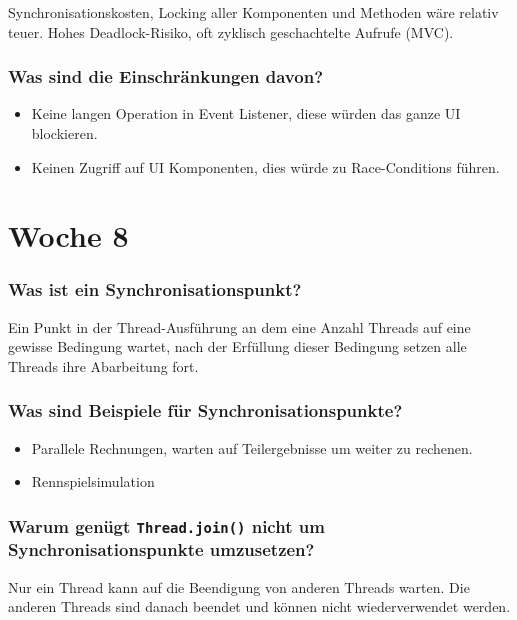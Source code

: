 \documentclass[10pt,a4paper]{scrartcl}
\begin{document}
Synchronisationskosten, Locking aller Komponenten und Methoden wäre relativ teuer.
Hohes Deadlock-Risiko, oft zyklisch geschachtelte Aufrufe (MVC).
   
\subsubsection{Was sind die Einschränkungen davon?}

\begin{itemize}
	\item Keine langen Operation in Event Listener, diese würden das ganze UI blockieren.
	\item Keinen Zugriff auf UI Komponenten, dies würde zu Race-Conditions führen.
\end{itemize}


\section{Woche 8}

\subsubsection{Was ist ein Synchronisationspunkt?}

Ein Punkt in der Thread-Ausführung an dem eine Anzahl Threads auf eine gewisse Bedingung wartet,
nach der Erfüllung dieser Bedingung setzen alle Threads ihre Abarbeitung fort.
  
\subsubsection{Was sind Beispiele für Synchronisationspunkte?}

\begin{itemize}
	\item Parallele Rechnungen, warten auf Teilergebnisse um weiter zu rechenen.
	\item Rennspielsimulation
\end{itemize}
  
\subsubsection{Warum genügt \texttt{Thread.join()} nicht um Synchronisationspunkte umzusetzen?}

Nur ein Thread kann auf die Beendigung von anderen Threads warten. Die anderen Threads sind danach
beendet und können nicht wiederverwendet werden.
  
\end{document}
